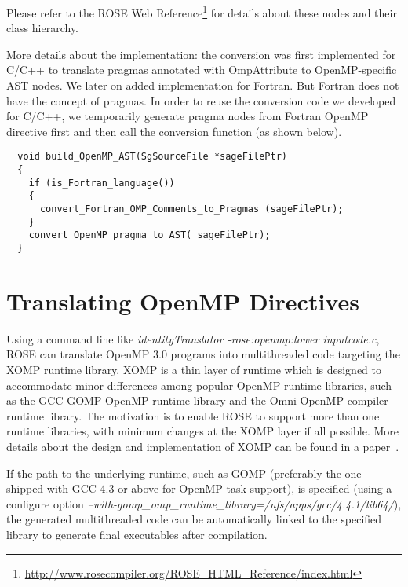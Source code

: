 Please refer to the ROSE Web Reference\footnote{\url{http://www.rosecompiler.org/ROSE_HTML_Reference/index.html}} for details about these nodes and their class hierarchy. 

More details about the implementation: the conversion was first implemented
for C/C++ to translate pragmas annotated with OmpAttribute to
OpenMP-specific AST nodes. We later on added implementation for Fortran. 
But Fortran does not have the concept of pragmas. In order to reuse the conversion
code we developed for C/C++, we temporarily generate pragma nodes from
Fortran OpenMP directive first and then call the conversion function (as shown below). 
\lstset{language=C,basicstyle=\scriptsize,numbers=left}
\begin{lstlisting}
  void build_OpenMP_AST(SgSourceFile *sageFilePtr)
  {
    if (is_Fortran_language())
    {
      convert_Fortran_OMP_Comments_to_Pragmas (sageFilePtr);
    }
    convert_OpenMP_pragma_to_AST( sageFilePtr);
  }

\end{lstlisting}
\lstset{language=C,basicstyle=\small}


\section{Translating OpenMP Directives}
Using a command line like \textit{identityTranslator -rose:openmp:lower inputcode.c},
ROSE can translate OpenMP 3.0 programs into multithreaded code targeting the XOMP runtime library. 
XOMP is a thin layer of runtime which is designed to accommodate minor differences among popular OpenMP runtime libraries, such as the GCC GOMP OpenMP runtime library and the Omni OpenMP compiler runtime library. 
The motivation is to enable ROSE to support more than one runtime libraries, with minimum changes at the XOMP layer if all possible. 
More details about the design and implementation of XOMP can be found in a paper~\cite{LiaoXOMP2010}.

If the path to the underlying runtime, such as GOMP (preferably the one shipped with GCC 4.3 or above for OpenMP task support), is specified (using a configure option \textit{--with-gomp\_omp\_runtime\_library=/nfs/apps/gcc/4.4.1/lib64/}),
the generated multithreaded code can be automatically linked to the specified library to generate final executables after compilation. 

